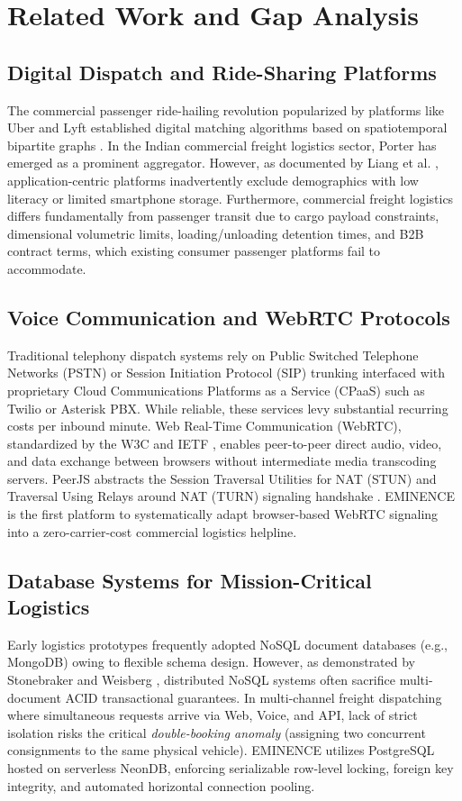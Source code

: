 \documentclass[conference]{IEEEtran}
\begin{document}
\section{Related Work and Gap Analysis}
\subsection{Digital Dispatch and Ride-Sharing Platforms}
The commercial passenger ride-hailing revolution popularized by platforms like Uber and Lyft established digital matching algorithms based on spatiotemporal bipartite graphs \cite{uber2016}. In the Indian commercial freight logistics sector, Porter has emerged as a prominent aggregator. However, as documented by Liang et al. \cite{liang2021}, application-centric platforms inadvertently exclude demographics with low literacy or limited smartphone storage. Furthermore, commercial freight logistics differs fundamentally from passenger transit due to cargo payload constraints, dimensional volumetric limits, loading/unloading detention times, and B2B contract terms, which existing consumer passenger platforms fail to accommodate.

\subsection{Voice Communication and WebRTC Protocols}
Traditional telephony dispatch systems rely on Public Switched Telephone Networks (PSTN) or Session Initiation Protocol (SIP) trunking interfaced with proprietary Cloud Communications Platforms as a Service (CPaaS) such as Twilio or Asterisk PBX. While reliable, these services levy substantial recurring costs per inbound minute. Web Real-Time Communication (WebRTC), standardized by the W3C and IETF \cite{alvestrand2011}, enables peer-to-peer direct audio, video, and data exchange between browsers without intermediate media transcoding servers. PeerJS abstracts the Session Traversal Utilities for NAT (STUN) and Traversal Using Relays around NAT (TURN) signaling handshake \cite{peerjs2023}. EMINENCE is the first platform to systematically adapt browser-based WebRTC signaling into a zero-carrier-cost commercial logistics helpline.

\subsection{Database Systems for Mission-Critical Logistics}
Early logistics prototypes frequently adopted NoSQL document databases (e.g., MongoDB) owing to flexible schema design. However, as demonstrated by Stonebraker and Weisberg \cite{stonebraker2013}, distributed NoSQL systems often sacrifice multi-document ACID transactional guarantees. In multi-channel freight dispatching where simultaneous requests arrive via Web, Voice, and API, lack of strict isolation risks the critical \textit{double-booking anomaly} (assigning two concurrent consignments to the same physical vehicle). EMINENCE utilizes PostgreSQL hosted on serverless NeonDB, enforcing serializable row-level locking, foreign key integrity, and automated horizontal connection pooling.
\end{document}
